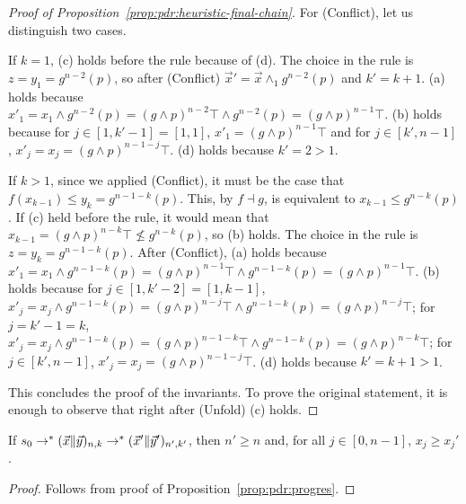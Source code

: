 \begin{proof}[Proof of Proposition~\ref{prop:pdr:heuristic-final-chain}]
	For (Conflict), let us distinguish two cases.

	If $k = 1$, (c) holds before the rule because of (d). The choice in the rule is $z = y_1 = g^{n-2} (p)$, so after (Conflict) $\vec{x}' = \vec{x} \land_1 g^{n-2} (p)$ and $k' = k+1$. (a) holds because $x'_1 = x_1 \land g^{n-2} (p) = (g \land p)^{n-2} \top \land g^{n-2} (p) = (g \land p)^{n-1} \top$. (b) holds because for $j \in [1, k' -1] = [1, 1]$, $x'_1 = (g \land p)^{n-1} \top$ and for $j \in [k', n-1]$, $x'_j = x_j = (g \land p)^{n-1-j} \top$. (d) holds because $k' = 2 > 1$.

	If $k > 1$, since we applied (Conflict), it must be the case that $f (x_{k-1}) \leq y_k = g^{n-1-k} (p)$. This, by $f \dashv g$, is equivalent to $x_{k-1} \leq g^{n-k} (p)$. If (c) held before the rule, it would mean that $x_{k-1} = (g \land p)^{n-k} \top \not\leq g^{n-k} (p)$, so (b) holds.
	The choice in the rule is $z = y_k = g^{n-1-k} (p)$. After (Conflict), (a) holds because $x'_1 = x_1 \land g^{n-1-k} (p) = (g \land p)^{n-1} \top \land g^{n-1-k} (p) = (g \land p)^{n-1} \top$. (b) holds because for $j \in [1, k'-2] = [1, k-1]$, $x'_j = x_j \land g^{n-1-k} (p) = (g \land p)^{n-j} \top \land g^{n-1-k} (p) = (g \land p)^{n-j} \top$; for $j = k'-1 = k$, $x'_j = x_j \land g^{n-1-k} (p) = (g \land p)^{n-1-k} \top \land g^{n-1-k} (p) = (g \land p)^{n-k} \top$; for $j \in [k', n-1]$, $x'_j = x_j = (g \land p)^{n-1-j} \top$. (d) holds because $k' = k + 1 > 1$.

	This concludes the proof of the invariants. To prove the original statement, it is enough to observe that right after (Unfold) (c) holds.
\end{proof}

\begin{lemma}\label{lmm:app:pdr-decreasing}
	If $s_0 \stackrel{}{\to^*}  ( \vec{x} \| \vec{y} )_{n,k} \stackrel{}{\to^*}  ( \vec{x}' \| \vec{y}' )_{n',k'}$, then $n'\geq n$ and, for all $j\in [0,n-1]$, $x_j \geq x_j'$.
\end{lemma}
\begin{proof}
	Follows from proof of Proposition~\ref{prop:pdr:progres}.
\end{proof}

